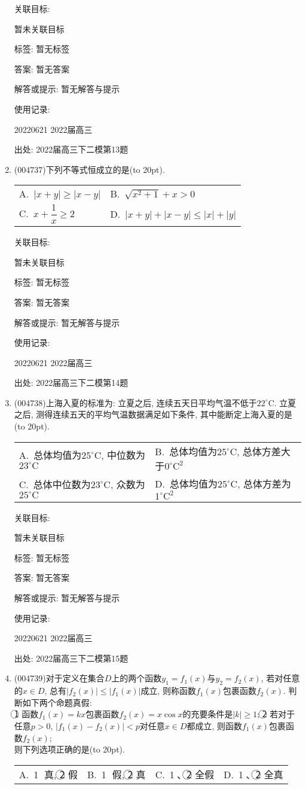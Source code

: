 \documentclass[10pt,a4paper]{article}
\newcommand{\bracket}[1]{(\hbox to #1pt{})}
\newcommand{\twoch}[4]{\par\begin{tabular}{p{.46\textwidth}p{.46\textwidth}}
A.~#1& B.~#2\\
C.~#3& D.~#4
\end{tabular}}
\newcommand{\fourch}[4]{\par\begin{tabular}{p{.23\textwidth}p{.23\textwidth}p{.23\textwidth}p{.23\textwidth}}
A.~#1 &B.~#2& C.~#3& D.~#4
\end{tabular}}
\begin{document}
\begin{enumerate}[1.]
关联目标:

暂未关联目标



标签: 暂无标签

答案: 暂无答案

解答或提示: 暂无解答与提示

使用记录:

20220621	2022届高三	


出处: 2022届高三下二模第13题
\item { (004737)}下列不等式恒成立的是\bracket{20}.
\twoch{$|x+y|\ge |x-y|$}{$\sqrt{x^2+1}+x>0$}{$x+\dfrac 1x\ge 2$}{$|x+y|+|x-y|\le |x|+|y|$}


关联目标:

暂未关联目标



标签: 暂无标签

答案: 暂无答案

解答或提示: 暂无解答与提示

使用记录:

20220621	2022届高三	


出处: 2022届高三下二模第14题
\item { (004738)}上海入夏的标准为: 立夏之后, 连续五天日平均气温不低于$22^\circ\text{C}$. 立夏之后, 测得连续五天的平均气温数据满足如下条件, 其中能断定上海入夏的是\bracket{20}.
\twoch{总体均值为$25^\circ\text{C}$, 中位数为$23^\circ\text{C}$}{总体均值为$25^\circ\text{C}$, 总体方差大于$0^\circ\text{C}^2$}{总体中位数为$23^\circ\text{C}$, 众数为$25^\circ\text{C}$}{总体均值为$25^\circ\text{C}$, 总体方差为$1^\circ\text{C}^2$}


关联目标:

暂未关联目标



标签: 暂无标签

答案: 暂无答案

解答或提示: 暂无解答与提示

使用记录:

20220621	2022届高三	


出处: 2022届高三下二模第15题
\item { (004739)}对于定义在集合$D$上的两个函数$y_1=f_1(x)$与$y_2=f_2(x)$, 若对任意的$x\in D$, 总有$|f_2(x)|\le |f_1(x)|$成立, 则称函数$f_1(x)$包裹函数$f_2(x)$. 判断如下两个命题真假:\\
\textcircled{1}  函数$f_1(x)=kx$包裹函数$f_2(x)=x\cos x$的充要条件是$|k|\ge 1$;
\textcircled{2}  若对于任意$p>0$, $|f_1(x)-f_2(x)|<p$对任意$x\in D$都成立, 则函数$f_1(x)$包裹函数$f_2(x)$;\\
则下列选项正确的是\bracket{20}.
\fourch{\textcircled{1} 真, \textcircled{2} 假}{\textcircled{1} 假, \textcircled{2} 真}{\textcircled{1}、\textcircled{2} 全假}{\textcircled{1}、\textcircled{2} 全真}



\end{enumerate}
\end{document}
